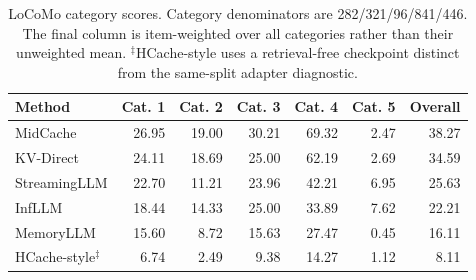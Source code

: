 \begin{table}[htbp]
\centering
\small
\setlength{\tabcolsep}{4pt}
\begin{tabular}{@{}lrrrrrr@{}}
\toprule
Method & Cat. 1 & Cat. 2 & Cat. 3 & Cat. 4 & Cat. 5 & Overall \\
\midrule
MidCache & 26.95 & 19.00 & 30.21 & 69.32 & 2.47 & 38.27 \\
KV-Direct & 24.11 & 18.69 & 25.00 & 62.19 & 2.69 & 34.59 \\
StreamingLLM & 22.70 & 11.21 & 23.96 & 42.21 & 6.95 & 25.63 \\
InfLLM & 18.44 & 14.33 & 25.00 & 33.89 & 7.62 & 22.21 \\
MemoryLLM & 15.60 & 8.72 & 15.63 & 27.47 & 0.45 & 16.11 \\
HCache-style$^{\ddagger}$ & 6.74 & 2.49 & 9.38 & 14.27 & 1.12 & 8.11 \\
\bottomrule
\end{tabular}
\caption{LoCoMo category scores. Category denominators are 282/321/96/841/446. The final column is item-weighted over all categories rather than their unweighted mean. $^{\ddagger}$HCache-style uses a retrieval-free checkpoint distinct from the same-split adapter diagnostic.}
\label{tab:locomo-categories}
\end{table}
